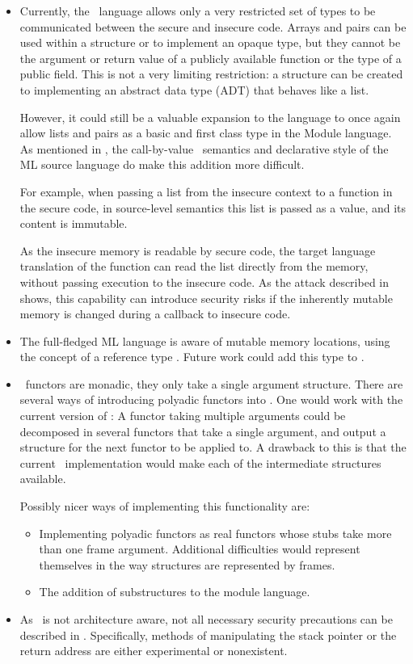 \begin{itemize}
\item
Currently, the \MiniML\ language allows only a very restricted set of types to be communicated between the secure and insecure code. 
Arrays and pairs can be used within a structure or to implement an opaque type, but they cannot be the argument or return value of a publicly available function or the type of a public field.
This is not a very limiting restriction: a structure can be created to implementing an abstract data type (ADT) that behaves like a list.

However, it could still be a valuable expansion to the language to once again allow lists and pairs as a basic and first class type in the Module language.
As mentioned in , the call-by-value~\cite{Milner:1997:DSM:549659} semantics and declarative style of the ML source language do make this addition more difficult.

For example, when passing a list from the insecure context to a function in the secure code, in source-level semantics this list is passed as a value, and its content is immutable.

As the insecure memory is readable by secure code, the target language translation of the function can read the list directly from the memory, without passing execution to the insecure code.
As the attack described in  shows, this capability can introduce security risks if the inherently mutable  memory is changed during a callback to insecure code.
\item
The full-fledged ML language is aware of mutable memory locations, using the concept of a reference type .
Future work could add this type to \MiniML.

\item
\MiniML\ functors are monadic, they only take a single argument structure.
There are several ways of introducing polyadic functors into \MiniML.
One would work with the current version of \MiniML:
A functor taking multiple arguments could be decomposed in several functors that take a single argument, and output a structure for the next functor to be applied to. 
A drawback to this is that the current \MiniML\ implementation would make each of the intermediate structures available.

Possibly nicer ways of implementing this functionality are:
\begin{itemize}
\item Implementing polyadic functors as real functors whose stubs take more than one frame argument.
Additional difficulties would represent themselves in the way structures are represented by frames.
\item The addition of substructures to the module language.
\end{itemize}
\item
As \LLVMIR\ is not architecture aware, not all necessary security precautions can be described in \LLVMIR.
Specifically, methods of manipulating the stack pointer or the return address are either experimental or nonexistent.


\end{itemize}
